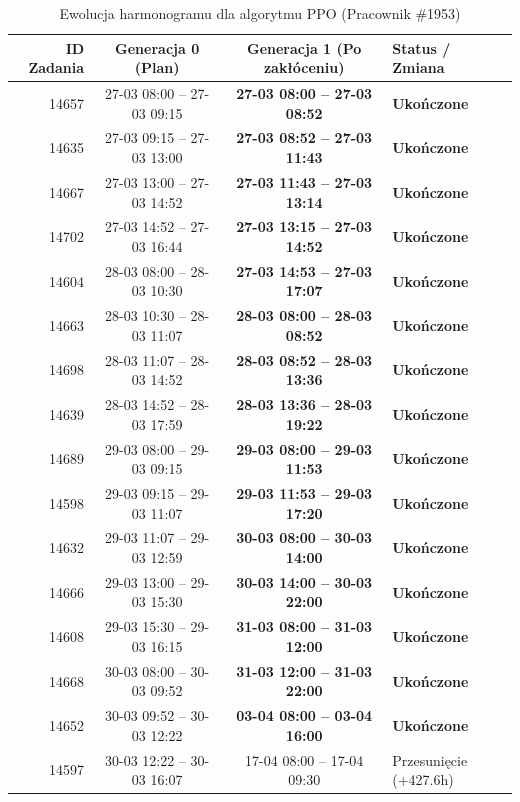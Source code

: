 \begin{table}[htbp]
\centering\small
\caption{Ewolucja harmonogramu dla algorytmu PPO (Pracownik \#1953)}
\label{tab:case_study_ppo_u1953}
\begin{tabular}{|r|c|c|l|}
\hline
\textbf{ID Zadania} & \textbf{Generacja 0 (Plan)} & \textbf{Generacja 1 (Po zakłóceniu)} & \textbf{Status / Zmiana} \\ \hline
14657 & 27-03 08:00 -- 27-03 09:15 & \textbf{27-03 08:00 -- 27-03 08:52} & \textbf{Ukończone} \\ 
14635 & 27-03 09:15 -- 27-03 13:00 & \textbf{27-03 08:52 -- 27-03 11:43} & \textbf{Ukończone} \\ 
14667 & 27-03 13:00 -- 27-03 14:52 & \textbf{27-03 11:43 -- 27-03 13:14} & \textbf{Ukończone} \\ 
14702 & 27-03 14:52 -- 27-03 16:44 & \textbf{27-03 13:15 -- 27-03 14:52} & \textbf{Ukończone} \\ 
14604 & 28-03 08:00 -- 28-03 10:30 & \textbf{27-03 14:53 -- 27-03 17:07} & \textbf{Ukończone} \\ 
14663 & 28-03 10:30 -- 28-03 11:07 & \textbf{28-03 08:00 -- 28-03 08:52} & \textbf{Ukończone} \\ 
14698 & 28-03 11:07 -- 28-03 14:52 & \textbf{28-03 08:52 -- 28-03 13:36} & \textbf{Ukończone} \\ 
14639 & 28-03 14:52 -- 28-03 17:59 & \textbf{28-03 13:36 -- 28-03 19:22} & \textbf{Ukończone} \\ 
14689 & 29-03 08:00 -- 29-03 09:15 & \textbf{29-03 08:00 -- 29-03 11:53} & \textbf{Ukończone} \\ 
14598 & 29-03 09:15 -- 29-03 11:07 & \textbf{29-03 11:53 -- 29-03 17:20} & \textbf{Ukończone} \\ 
14632 & 29-03 11:07 -- 29-03 12:59 & \textbf{30-03 08:00 -- 30-03 14:00} & \textbf{Ukończone} \\ 
14666 & 29-03 13:00 -- 29-03 15:30 & \textbf{30-03 14:00 -- 30-03 22:00} & \textbf{Ukończone} \\ 
14608 & 29-03 15:30 -- 29-03 16:15 & \textbf{31-03 08:00 -- 31-03 12:00} & \textbf{Ukończone} \\ 
14668 & 30-03 08:00 -- 30-03 09:52 & \textbf{31-03 12:00 -- 31-03 22:00} & \textbf{Ukończone} \\ 
14652 & 30-03 09:52 -- 30-03 12:22 & \textbf{03-04 08:00 -- 03-04 16:00} & \textbf{Ukończone} \\ 
14597 & 30-03 12:22 -- 30-03 16:07 & 17-04 08:00 -- 17-04 09:30 & Przesunięcie (+427.6h) \\ 

\end{tabular}
\end{table}
